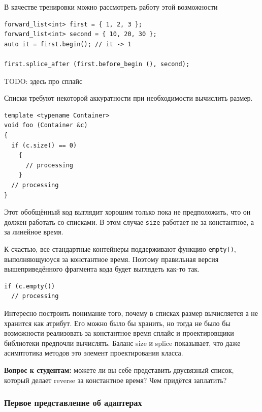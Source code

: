 \documentclass[a4paper,12pt,oneside]{article}
\newif\ifanswers
\begin{document}
В качестве тренировки можно рассмотреть работу этой возможности 

\begin{lstlisting}
forward_list<int> first = { 1, 2, 3 }; 
forward_list<int> second = { 10, 20, 30 }; 
auto it = first.begin(); // it -> 1

first.splice_after (first.before_begin (), second);
\end{lstlisting}

TODO: здесь про сплайс

Списки требуют некоторой аккуратности при необходимости вычислить размер.

\begin{lstlisting}
template <typename Container> 
void foo (Container &c) 
{
  if (c.size() == 0)
    {
      // processing
    }
  // processing
}
\end{lstlisting}

Этот обобщённый код выглядит хорошим только пока не предположить, что он должен работать со списками. В этом случае \lstinline!size! работает не за константное, а за линейное время.

К счастью, все стандартные контейнеры поддерживают функцию \lstinline!empty()!, выполняющуюуся за константное время. Поэтому правильная версия вышеприведённого фрагмента кода будет выглядеть как-то так.

\begin{lstlisting}
if (c.empty())
  // processing
\end{lstlisting}

Интересно построить понимание того, почему в списках размер вычисляется а не хранится как атрибут. Его можно было бы хранить, но тогда не было бы возможности реализовать за константное время сплайс и проектировщики библиотеки предпочли вычислять. Баланс size и splice показывает, что даже асимптотика методов это элемент проектирования класса.

\textbf{Вопрос к студентам:} можете ли вы себе представить двусвязный список, который делает reverse за константное время? Чем придётся заплатить?

\ifanswers
Например хранить в списке поле direction и сверяться с ним при переходе к next для выбора конкретной связи для перехода. Цена в общем-то невелика, но обычно её не платят, уж больно reverse специфичная и редко нужная штука.
\fi

\subsubsection{Первое представление об адаптерах}
\end{document}
